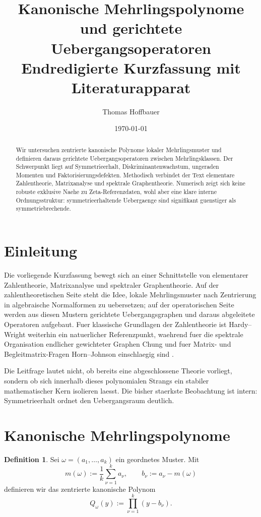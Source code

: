 \documentclass[11pt,a4paper]{article}
\title{Kanonische Mehrlingspolynome und gerichtete Uebergangsoperatoren\\
\large Endredigierte Kurzfassung mit Literaturapparat}
\author{Thomas Hoffbauer}
\date{\today}
\theoremstyle{definition}
\newtheorem{definition}[satz]{Definition}
\begin{document}
\maketitle

\begin{abstract}
Wir untersuchen zentrierte kanonische Polynome lokaler Mehrlingsmuster und definieren daraus gerichtete Uebergangsoperatoren zwischen Mehrlingsklassen. Der Schwerpunkt liegt auf Symmetrieerhalt, Diskriminantenwachstum, ungeraden Momenten und Faktorisierungsdefekten. Methodisch verbindet der Text elementare Zahlentheorie, Matrixanalyse und spektrale Graphentheorie. Numerisch zeigt sich keine robuste exklusive Naehe zu Zeta-Referenzdaten, wohl aber eine klare interne Ordnungsstruktur: symmetrieerhaltende Uebergaenge sind signifikant guenstiger als symmetriebrechende.
\end{abstract}

\section{Einleitung}

Die vorliegende Kurzfassung bewegt sich an einer Schnittstelle von elementarer Zahlentheorie, Matrixanalyse und spektraler Graphentheorie. Auf der zahlentheoretischen Seite steht die Idee, lokale Mehrlingsmuster nach Zentrierung in algebraische Normalformen zu uebersetzen; auf der operatorischen Seite werden aus diesen Mustern gerichtete Uebergangsgraphen und daraus abgeleitete Operatoren aufgebaut. Fuer klassische Grundlagen der Zahlentheorie ist Hardy--Wright weiterhin ein natuerlicher Referenzpunkt, waehrend fuer die spektrale Organisation endlicher gewichteter Graphen Chung und fuer Matrix- und Begleitmatrix-Fragen Horn--Johnson einschlaegig sind \cite{hardywright2008,chung1997,hornjohnson2012}.

Die Leitfrage lautet nicht, ob bereits eine abgeschlossene Theorie vorliegt, sondern ob sich innerhalb dieses polynomialen Strangs ein stabiler mathematischer Kern isolieren laesst. Die bisher staerkste Beobachtung ist intern: Symmetrieerhalt ordnet den Uebergangsraum deutlich.

\section{Kanonische Mehrlingspolynome}

\begin{definition}
Sei \(\omega=(a_1,\dots,a_k)\) ein geordnetes Muster. Mit
\[
m(\omega):=\frac{1}{k}\sum_{\nu=1}^k a_\nu,\qquad b_\nu:=a_\nu-m(\omega)
\]
definieren wir das zentrierte kanonische Polynom
\[
Q_\omega(y):=\prod_{\nu=1}^k (y-b_\nu).
\]
\end{definition}
\end{document}
